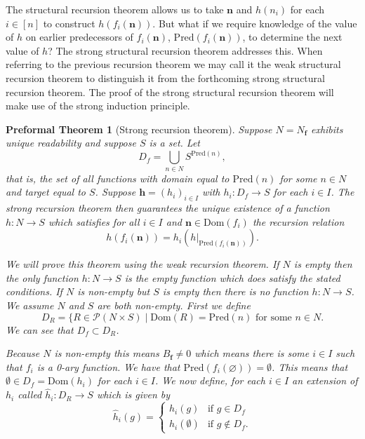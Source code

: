 \documentclass[oneside, 12pt]{book}
\theoremstyle{break}
\newtheorem{preformal definition}[definition]{Preformal Definition}
\newtheorem{preformal theorem}[theorem]{Preformal Theorem}
\newcommand{\bv}[1]{\boldsymbol{#1}}
\newcommand{\mc}[1]{\mathcal{#1}}
\begin{document}
			The structural recursion theorem allows us to take $\bv{n}$ and $h(n_i)$ for each $i\in [n]$ to construct $h(f_i(\bv{n}))$.
			But what if we require knowledge of the value of $h$ on earlier predecessors of $f_i(\bv{n})$, $\text{Pred}(f_i(\bv{n}))$, to determine the next value of $h$? 
			The strong structural recursion theorem addresses this.
			When referring to the previous recursion theorem we may call it the weak structural recursion theorem to distinguish it from the forthcoming strong structural recursion theorem.
			The proof of the strong structural recursion theorem will make use of the strong induction principle.
						
			\begin{preformal theorem}[Strong recursion theorem]
				Suppose $N=N_{\bv{f}}$ exhibits unique readability and suppose $S$ is a set.
				Let
				\begin{equation*}
					D_f = \bigcup_{n\in N} S^{\text{Pred}(n)},
				\end{equation*}
				that is, the set of all functions with domain equal to $\text{Pred}(n)$ for some $n\in N$ and target equal to $S$.
				Suppose $\bv{h} = (h_i)_{i\in I}$ with $h_i: D_f \to S$ for each $i\in I$.
				The strong recursion theorem then guarantees the unique existence of a function $h:N \to S$ which satisfies for all $i\in I$ and $\bv{n} \in \text{Dom}(f_i)$ the recursion relation
				\begin{equation*}
					h(f_i(\bv{n})) = h_i(h|_{\text{Pred}(f_i(\bv{n}))}).
				\end{equation*}
				
				We will prove this theorem using the weak recursion theorem.
				If $N$ is empty then the only function $h:N \to S$ is the empty function which does satisfy the stated conditions.
				If $N$ is non-empty but $S$ is empty then there is no function $h:N \to S$. 
				We assume $N$ and $S$ are both non-empty.
				First we define
				\begin{equation*}
					D_R = \{R \in \mc{P}(N\times S) \mid \text{Dom}(R) = \text{Pred}(n) \text{ for some } n \in N.
				\end{equation*}
				We can see that $D_f \subset D_R$.
				
				Because $N$ is non-empty this means $B_{\bv{f}} \neq 0$ which means there is some $i\in I$ such that $f_i$ is a 0-ary function. 
				We have that $\text{Pred}(f_i(\varnothing)) = \emptyset$.
				This means that $\emptyset \in D_f = \text{Dom}(h_i)$ for each $i\in I$.
				We now define, for each $i\in I$ an extension of $h_i$ called $\hat{h}_i: D_R \to S$ which is given by
				\begin{equation*}
					\hat{h}_i(g) = \begin{cases}
						h_i(g) & \text{if } g \in D_f\\
						h_i(\emptyset) & \text{if } g \not \in D_f.
					\end{cases}
				\end{equation*}
				

\end{preformal theorem}
\end{document}
